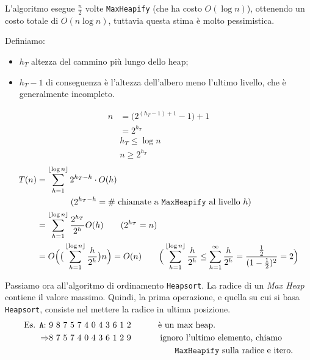 
L'algoritmo esegue $\frac{n}{2}$ volte \texttt{MaxHeapify} (che ha costo $O(\log n)$),
ottenendo un costo totale di $O(n \log n)$, 
tuttavia questa stima è molto pessimistica.\par
Definiamo: 
\begin{itemize}[noitemsep]
	\item $h_T$ altezza del cammino più lungo dello heap;
	\item $h_T - 1$ di conseguenza è l'altezza dell'albero meno l'ultimo livello, che è
	generalmente incompleto.
\end{itemize}

\begin{align*}
	n & = \Big( 2^{(h_T-1)+1} - 1\Big) + 1 \\
	& = 2^{h_T} \\
	& h_T \leq \log n \\
	& n \geq 2^{h_T}
\end{align*}
\begin{align*}
	T(n) & = \displaystyle\sum_{h = 1}^{\lfloor\log n\rfloor} 2^{h_T - h} \cdot O(h) \\
	& \hspace{1.4cm} (2^{h_T - h} = \text{\# chiamate a \texttt{MaxHeapify} al livello } h) \\
	& = \displaystyle\sum_{h = 1}^{\lfloor\log n\rfloor} \frac{2^{h_T}}{2^h}O(h) \qquad (2^{h_T} = n) \\
	& = O \Big( \big(\displaystyle\sum_{h = 1}^{\lfloor\log n\rfloor} \frac{h}{2^h} \big) n \Big) = O(n) 
		\qquad \Big( \displaystyle\sum_{h = 1}^{\lfloor\log n\rfloor} \frac{h}{2^h} \leq \displaystyle\sum_{h = 1}^{\infty} \frac{h}{2^h} 
		= \frac{\frac{1}{2}}{(1 - \frac{1}{2})^2} = 2 \Big)
\end{align*}


Passiamo ora all'algoritmo di ordinamento \texttt{Heapsort}. La radice di un 
\emph{Max Heap} contiene il valore massimo. Quindi, la prima operazione, e quella su cui si basa \texttt{Heapsort}, 
consiste nel mettere la radice in ultima posizione.
\begin{align*}
\text{Es. \texttt{A}: }& \text{9 8 7 5 7 4 0 4 3 6 1 2 \hspace{1cm}} \text{è un max heap.} \\
\Rightarrow & \text{8 7 5 7 4 0 4 3 6 1 2 9} \hspace{1.2cm} \text{ignoro l'ultimo elemento, chiamo} \\
& \hspace{5.2cm}\text{\texttt{MaxHeapify} sulla radice e itero.}
\end{align*}

